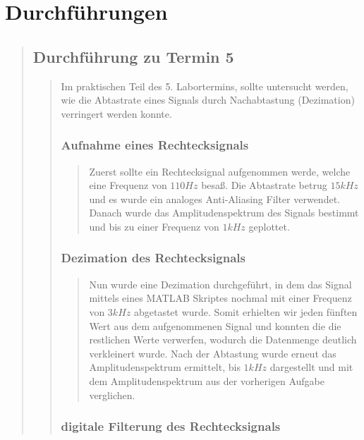 \section{Durchführungen}
\begin{quote}
		
		\subsection{Durchführung zu Termin 5}
		\begin{quote}
			
			Im praktischen Teil des 5. Labortermins, sollte untersucht werden, wie die
			Abtastrate eines Signals durch Nachabtastung (Dezimation) verringert werden
			konnte.
			
			\subsubsection{Aufnahme eines Rechtecksignals}
			\begin{quote}
			
			Zuerst sollte ein Rechtecksignal aufgenommen werde, welche eine Frequenz von
			$110 Hz$ besaß. Die Abtastrate betrug $15 kHz$ und es wurde ein analoges
			Anti-Aliasing Filter verwendet. Danach wurde das Amplitudenspektrum des
			Signals bestimmt und bis zu einer Frequenz von $1 kHz$ geplottet. 
			
			\end{quote}%
			
			\subsubsection{Dezimation des Rechtecksignals}
			\begin{quote}
			
			Nun wurde eine Dezimation durchgeführt, in dem das Signal mittels eines MATLAB
			Skriptes nochmal mit einer Frequenz von $3 kHz$ abgetastet wurde. Somit
			erhielten wir jeden fünften Wert aus dem aufgenommenen Signal und konnten
			die die restlichen Werte verwerfen, wodurch die Datenmenge deutlich
			verkleinert wurde. Nach der Abtastung wurde erneut das Amplitudenspektrum
			ermittelt, bis $1 kHz$ dargestellt und mit dem Amplitudenspektrum aus der
			vorherigen Aufgabe verglichen.
			
			\end{quote}%
			
			\subsubsection{digitale Filterung des Rechtecksignals}
			\begin{quote}
			

\end{quote}
\end{quote}
\end{quote}
